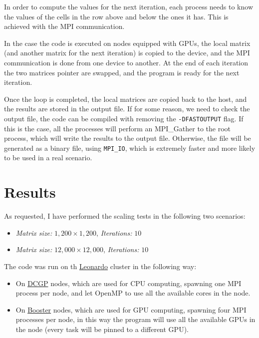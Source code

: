 \documentclass{article}
\begin{document}
    \noindent In order to compute the values for the next iteration, each process needs to know the values of the cells in the row
    above and below the ones it has.
    This is achieved with the MPI communication.

    In the case the code is executed on nodes equipped with GPUs, the local matrix (and another matrix for the next iteration)
    is copied to the device, and the MPI communication is done from one device to another.
    At the end of each iteration the two matrices pointer are swapped, and the program is ready for the next iteration.

    \noindent Once the loop is completed, the local matrices are copied back to the host, and the results are stored in the output file.
    If for some reason, we need to check the output file, the code can be compiled with removing the \texttt{-DFASTOUTPUT} flag.
    If this is the case, all the processes will perform an MPI\_Gather to the root process, which will write the results to the output file.
    Otherwise, the file will be generated as a binary file, using \texttt{MPI\_IO}, which is extremely faster and more likely to be used in a real scenario.

    \section{Results}

    As requested, I have performed the scaling tests in the following two scenarios:

    \begin{itemize}
        \itemsep0em
        \item \textit{Matrix size:} $1,200 \times 1,200$, \textit{Iterations:} $10$
        \item \textit{Matrix size:} $12,000 \times 12,000$, \textit{Iterations:} $10$
    \end{itemize}

    The code was run on th \href{https://leonardo-supercomputer.cineca.eu/}{Leonardo} cluster in the following way:

    \begin{itemize}
        \itemsep0em
        \item On \href{https://wiki.u-gov.it/confluence/display/SCAIUS/UG3.2.2%3A+LEONARDO+DCGP+UserGuide}{DCGP} nodes, which are used for CPU computing,
             spawning one MPI process per node, and let OpenMP to use all the available cores in the node.
        \item On \href{https://wiki.u-gov.it/confluence/display/SCAIUS/UG3.2.1%3A+LEONARDO+Booster+UserGuide}{Booster} nodes, which are used for GPU computing,
             spawning four MPI processes per node, in this way the program will use all the available GPUs in the node (every task will be pinned to a different GPU).
    \end{itemize}
\end{document}
